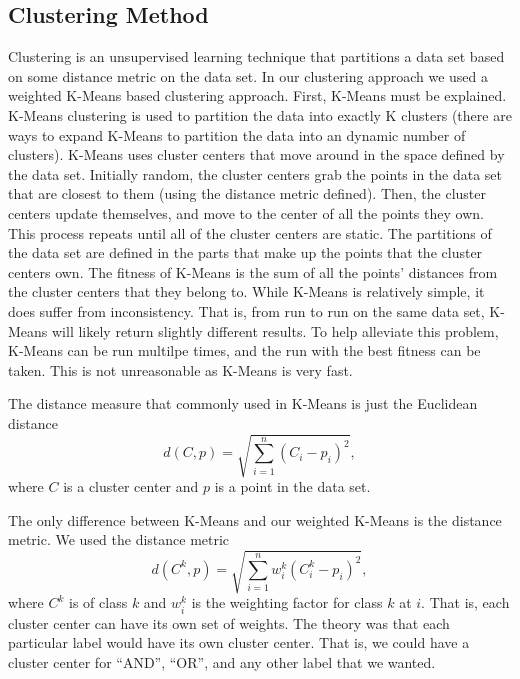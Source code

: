 \documentclass[10pt]{acmsiggraph}               %
\begin{document}
\subsection{Clustering Method}
Clustering is an unsupervised learning technique that partitions a data set based on some distance metric on the data set.
In our clustering approach we used a weighted K-Means based clustering approach.
First, K-Means must be explained.
K-Means clustering is used to partition the data into exactly K clusters (there are ways to expand K-Means to partition the data into an dynamic number of clusters).
K-Means uses cluster centers that move around in the space defined by the data set.
Initially random, the cluster centers grab the points in the data set that are closest to them (using the distance metric defined).
Then, the cluster centers update themselves, and move to the center of all the points they own.
This process repeats until all of the cluster centers are static.
The partitions of the data set are defined in the parts that make up the points that the cluster centers own.
The fitness of K-Means is the sum of all the points' distances from the cluster centers that they belong to.
While K-Means is relatively simple, it does suffer from inconsistency.
That is, from run to run on the same data set, K-Means will likely return slightly different results.
To help alleviate this problem, K-Means can be run multilpe times, and the run with the best fitness can be taken.
This is not unreasonable as K-Means is very fast.

The distance measure that commonly used in K-Means is just the Euclidean distance
$$
d(C, p) = \sqrt{\sum_{i=1}^{n} (C_i - p_i)^2},
$$
where $C$ is a cluster center and $p$ is a point in the data set.

The only difference between K-Means and our weighted K-Means is the distance metric.
We used the distance metric
$$
d(C^k, p) = \sqrt{\sum_{i=1}^{n} w_i^k (C_i^k - p_i)^2},
$$
where $C^k$ is of class $k$ and $w_i^k$ is the weighting factor for class $k$ at $i$.
That is, each cluster center can have its own set of weights.
The theory was that each particular label would have its own cluster center.
That is, we could have a cluster center for ``AND'', ``OR'', and any other label that we wanted.
\end{document}
